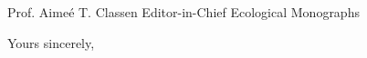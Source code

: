 \documentclass[10pt, a4paper]{letter} %
\begin{document}
\begin{letter}{
Prof. Aimeé T. Classen
Editor-in-Chief
Ecological Monographs
}
\closing{Yours sincerely,}




\end{letter}
\end{document}
